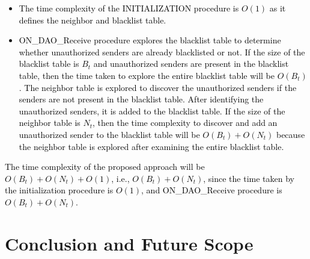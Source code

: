 \documentclass[conference, a4paper]{IEEEtran}
\begin{document}
\begin{itemize}
    \item \textcolor{black}{The time complexity of the INITIALIZATION procedure is $O(1)$ as it defines the neighbor and blacklist table.}
    \item \textcolor{black}{ON\_DAO\_Receive procedure explores the blacklist table to determine whether unauthorized senders are already blacklisted or not. If the size of the blacklist table is $B_t$ and unauthorized senders are present in the blacklist table, then the time taken to explore the entire blacklist table will be $O(B_t)$. The neighbor table is explored to discover the unauthorized senders if the senders are not present in the blacklist table. After identifying the unauthorized senders, it is added to the blacklist table. If the size of the neighbor table is $N_t$, then the time complexity to discover and add an unauthorized sender to the blacklist table will be $O(B_t)+O(N_t)$ because the neighbor table is explored after examining the entire blacklist table.}
\end{itemize}
\textcolor{black}{The time complexity of the proposed approach will be $O(B_t)+O(N_t)+O(1)$, i.e., $O(B_t)+O(N_t)$, since the time taken by the initialization procedure is $O(1)$, and ON\_DAO\_Receive procedure is $O(B_t)+O(N_t)$.} 


\section{Conclusion and Future Scope}\label{Sec:conclusion}

\end{document}
